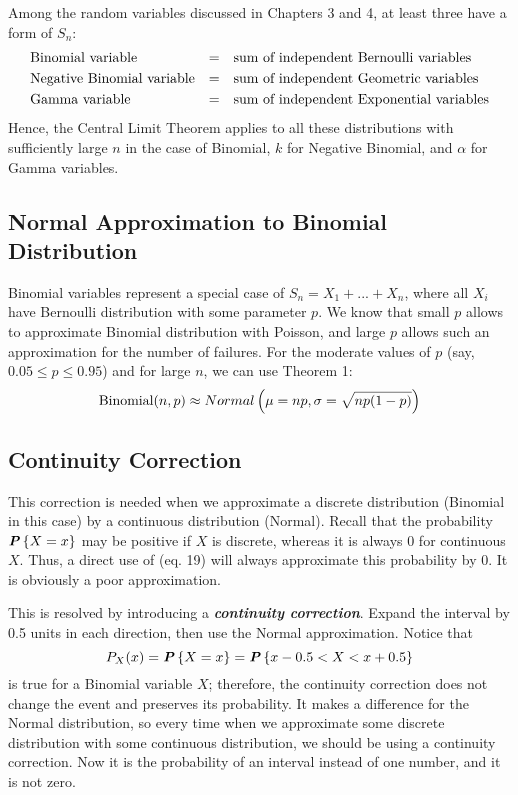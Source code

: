Among the random variables discussed in Chapters 3 and 4, at least three have a form of $S_n$:
\begin{align*}
    &\textnormal{Binomial variable} &= &&&\textnormal{sum of independent Bernoulli variables}\\
    &\textnormal{Negative Binomial variable} &= &&&\textnormal{sum of independent Geometric variables}\\
    &\textnormal{Gamma variable} &= &&&\textnormal{sum of independent Exponential variables}
\end{align*}
Hence, the Central Limit Theorem applies to all these distributions with sufficiently large $n$ in the case of Binomial, $k$ for Negative Binomial, and $\alpha$ for Gamma variables.

\subsection{Normal Approximation to Binomial Distribution}

Binomial variables represent a special case of $S_n = X_1 + ... + X_n$, where all $X_i$ have Bernoulli distribution with some parameter $p$. We know that small $p$ allows to approximate Binomial distribution with Poisson, and large $p$ allows such an approximation for the number of failures. For the moderate values of $p$ (say, $0.05 \leq p \leq 0.95$) and for large $n$, we can use Theorem 1:
\begin{equation}
    \textnormal{Binomial}(n, p) \approx Normal \left( \mu = np, \sigma = \sqrt{np(1-p)} \right)
\end{equation}

\subsection{Continuity Correction}

This correction is needed when we approximate a discrete distribution (Binomial in this case) by a continuous distribution (Normal). Recall that the probability $\textbf{\textit{P}}\left\{X = x\right\}$ may be positive if $X$ is discrete, whereas it is always 0 for continuous $X$. Thus, a direct use of (eq. 19) will always approximate this probability by 0. It is obviously a poor approximation.

This is resolved by introducing a \textbf{\textit{continuity correction}}. Expand the interval by 0.5 units in each direction, then use the Normal approximation. Notice that
\begin{equation*}
    P_X(x) = \textbf{\textit{P}}\left\{X = x\right\} = \textbf{\textit{P}}\left\{x - 0.5 < X < x + 0.5\right\}
\end{equation*}
is true for a Binomial variable $X$; therefore, the continuity correction does not change the event and preserves its probability. It makes a difference for the Normal distribution, so every time when we approximate some discrete distribution with some continuous distribution, we should be using a continuity correction. Now it is the probability of an interval instead of one number, and it is not zero.

